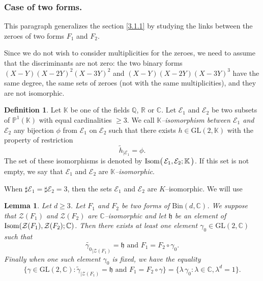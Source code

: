 \documentclass[10pt]{article}
\newtheorem{lemma}[theorem]{Lemma}
\theoremstyle{definition}
\newtheorem{definition}[theorem]{Definition}
\numberwithin{equation}{section}
\newcommand {\Q}{{\mathbb{Q}}}
\newcommand {\C}{{\mathbb{C}}}
\newcommand {\PP}{{\mathbb{P}}}
\newcommand {\R}{{\mathbb{R}}}
\newcommand {\K}{{\mathbb{K}}}
\newcommand{\Bin}{\mathrm {Bin}}
\newcommand{\GL}{\mathrm {GL}}
\begin{document}
\subsubsection{Case of two forms.} %

This paragraph generalizes the section \ref{3.1.1}
by studying the links between the zeroes of two forms $F_1$ and $F_2$. 

Since we do not wish to consider multiplicities for the zeroes, we need to assume that the discriminants are not zero: the two binary forms $(X-Y) (X-2Y)^2(X-3Y)^2$ and $(X-Y)(X-2Y)(X-3Y)^3$ have the same degree, the same sets of zeroes (not with the same multiplicities), and they are not isomorphic. 

\begin{definition}%
Let $\K$ be one of the fields $\Q$, $\R$ or $\C$. Let $\mathcal E_1$ and $\mathcal E_2$ be two subsets of $\PP^1 (\K)$ with equal cardinalities $\geqslant 3$. We call {\em $\K$--isomorphism between $\mathcal E_1$ and $\mathcal E_2$} any bijection $\phi$ from $\mathcal E_1$ on $\mathcal E_2$ such that there exists $h\in {\GL}(2,\K)$ with the property of restriction 
\[
\tilde h_{\vert \mathcal E_1} = \phi. 
\]
The set of these isomorphisms is denoted by ${\rm Isom}\bigl(\, \mathcal E_1, \mathcal E_2; \K\, \bigr)$. If this set is not empty, we say that $\mathcal E_1$ and $\mathcal E_2$ are {\em $\K$--isomorphic}.
\end{definition}
When $\sharp \mathcal E_1 = \sharp \mathcal E_2 =3$, then the sets $\mathcal E_1$ and $\mathcal E_2$ are $K$--isomorphic.
We will use 
\begin{lemma}\label{iso<->auto} Let $d \geqslant 3$. Let $F_1$ and $F_2$ be two forms of $\Bin  (d, \C)$. We suppose that $\mathcal Z (F_1)$ and $\mathcal Z (F_2)$ are $\C$--isomorphic and let $\mathfrak h$ be
an element of ${\rm Isom} (\mathcal Z (F_1), \mathcal Z(F_2); \C)$. Then there exists at least one element $\gamma_0 \in {\GL}(2, \C)$ such that 
\begin{equation} \label{348}
\tilde {\gamma_0}_{\vert {\mathcal Z (F_1)} }= \mathfrak h \text{ and } F_1= F_2 \circ \gamma_0.
\end{equation}
Finally when one such element $\gamma_0$ is fixed, we have the equality
\begin{equation}\label{equalityofsets}
\{ \gamma \in {\GL}(2, \C): \tilde {\gamma }_{\vert {\mathcal Z }(F_1)} = \mathfrak h \text{ and } F_1= F_2 \circ \gamma\} = \{ \lambda\, \gamma_0 : \lambda \in \C, \lambda^d=1 \}.
\end{equation}
\end{lemma}
\end{document}
